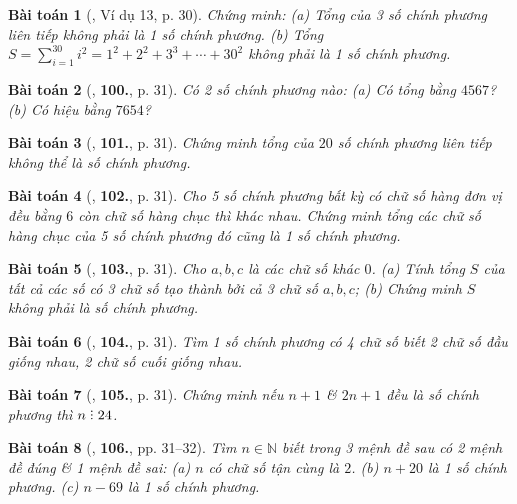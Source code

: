 \documentclass{article}
\numberwithin{equation}{section}
\newtheorem{baitoan}{Bài toán}
\DeclareRobustCommand{\divby}{%
	\mathrel{\vbox{\baselineskip.65ex\lineskiplimit0pt\hbox{.}\hbox{.}\hbox{.}}}%
}
\begin{document}
\begin{baitoan}[\cite{Tuyen_Toan_8}, Ví dụ 13, p. 30]
	Chứng minh: (a) Tổng của 3 số chính phương liên tiếp không phải là 1 số chính phương. (b) Tổng $S = \sum_{i=1}^{30} i^2 = 1^2 + 2^2 + 3^3 + \cdots + 30^2$ không phải là 1 số chính phương.
\end{baitoan}

\begin{baitoan}[\cite{Tuyen_Toan_8}, \textbf{100.}, p. 31]
	Có 2 số chính phương nào: (a) Có tổng bằng $4567$? (b) Có hiệu bằng $7654$?
\end{baitoan}

\begin{baitoan}[\cite{Tuyen_Toan_8}, \textbf{101.}, p. 31]
	Chứng minh tổng của $20$ số chính phương liên tiếp không thể là số chính phương.
\end{baitoan}

\begin{baitoan}[\cite{Tuyen_Toan_8}, \textbf{102.}, p. 31]
	Cho 5 số chính phương bất kỳ có chữ số hàng đơn vị đều bằng $6$ còn chữ số hàng chục thì khác nhau. Chứng minh tổng các chữ số hàng chục của 5 số chính phương đó cũng là 1 số chính phương.
\end{baitoan}

\begin{baitoan}[\cite{Tuyen_Toan_8}, \textbf{103.}, p. 31]
	Cho $a,b,c$ là các chữ số khác $0$. (a) Tính tổng $S$ của tất cả các số có 3 chữ số tạo thành bởi cả 3 chữ số $a,b,c$; (b) Chứng minh $S$ không phải là số chính phương.
\end{baitoan}

\begin{baitoan}[\cite{Tuyen_Toan_8}, \textbf{104.}, p. 31]
	Tìm 1 số chính phương có 4 chữ số biết 2 chữ số đầu giống nhau, 2 chữ số cuối giống nhau.
\end{baitoan}

\begin{baitoan}[\cite{Tuyen_Toan_8}, \textbf{105.}, p. 31]
	Chứng minh nếu $n + 1$ \& $2n + 1$ đều là số chính phương thì $n\divby24$.
\end{baitoan}

\begin{baitoan}[\cite{Tuyen_Toan_8}, \textbf{106.}, pp. 31--32]
	Tìm $n\in\mathbb{N}$ biết trong 3 mệnh đề sau có 2 mệnh đề đúng \& 1 mệnh đề sai: (a) $n$ có chữ số tận cùng là $2$. (b) $n + 20$ là 1 số chính phương. (c) $n - 69$ là 1 số chính phương.
\end{baitoan}
\end{document}
